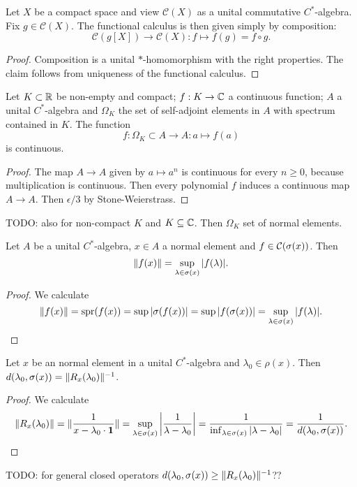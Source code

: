 \begin{lemma}
Let $X$ be a compact space and view $\mathcal{C}(X)$ as a unital commutative $C^*$-algebra. Fix $g\in\mathcal{C}(X)$. The functional calculus is then given simply by composition:
\[ \mathcal{C}(g[X]) \to \mathcal{C}(X): f\mapsto f(g) = f\circ g. \]
\end{lemma}
\begin{proof}
Composition is a unital $*$-homomorphism with the right properties. The claim follows from uniqueness of the functional calculus.
\end{proof}


\begin{proposition} \label{continuityContinuousFunctionalCalculus}
Let $K\subset \mathbb{R}$ be non-empty and compact; $f:K\to \mathbb{C}$ a continuous function; $A$ a unital $C^*$-algebra and $\Omega_K$ the set of self-adjoint elements in $A$ with spectrum contained in $K$. The function
\[ f: \Omega_K\subset A \to A: a\mapsto f(a) \]
is continuous.
\end{proposition}
\begin{proof}
The map $A\to A$ given by $a\mapsto a^n$ is continuous for every $n\geq 0$, because multiplication is continuous. Then every polynomial $f$ induces a continuous map $A\to A$.
Then $\epsilon/3$ by Stone-Weierstrass.
\end{proof}
TODO: also for non-compact $K$ and $K\subseteq \mathbb{C}$. Then $\Omega_K$ set of normal elements.

\begin{proposition}
Let $A$ be a unital $C^*$-algebra, $x\in A$ a normal element and $f\in \operatorname{\mathcal{C}}(\sigma(x))$. Then
\[ \lVert f(x)\rVert = \sup_{\lambda\in \sigma(x)}|f(\lambda)|. \]
\end{proposition}
\begin{proof}
We calculate
\[ \lVert f(x)\rVert = \operatorname{spr}(f(x)) = \sup |\sigma(f(x))| = \sup |f(\sigma(x))| = \sup_{\lambda\in \sigma(x)}|f(\lambda)|. \]
\end{proof}
\begin{corollary}
Let $x$ be an normal element in a unital $C^*$-algebra and $\lambda_0 \in \rho(x)$. Then $d(\lambda_0, \sigma(x)) = \lVert R_x(\lambda_0)\rVert^{-1}$.
\end{corollary}
\begin{proof}
We calculate
\[ \lVert R_x(\lambda_0)\rVert = \lVert\frac{1}{x-\lambda_0\cdot \boldsymbol{\mathrm{1}}}\rVert = \sup_{\lambda\in \sigma(x)}\left|\frac{1}{\lambda - \lambda_0}\right| = \frac{1}{\inf_{\lambda\in \sigma(x)}|\lambda- \lambda_0|} = \frac{1}{d(\lambda_0, \sigma(x))}. \]
\end{proof}
TODO: for general closed operators $d(\lambda_0, \sigma(x)) \geq \lVert R_x(\lambda_0)\rVert^{-1}$??

